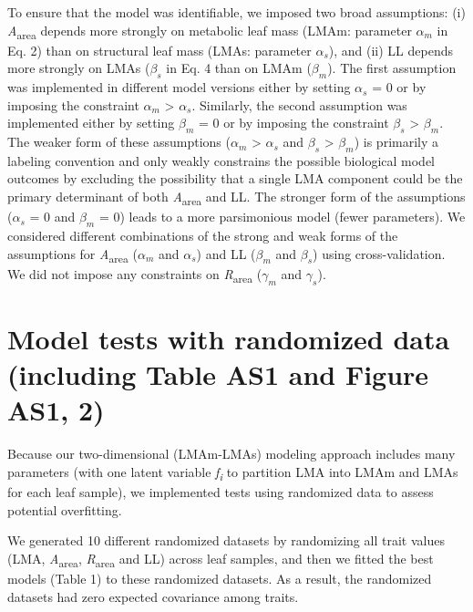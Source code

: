\documentclass[
  12pt,
  letterpaper,
  DIV=11,
  numbers=noendperiod]{scrartcl}
\numberwithin{equation}{section}
\begin{document}
To ensure that the model was identifiable, we imposed two broad
assumptions: (i) \emph{A}\textsubscript{area} depends more strongly on
metabolic leaf mass (LMAm: parameter \(\alpha_m\) in Eq. 2) than on
structural leaf mass (LMAs: parameter \(\alpha_s\)), and (ii) LL depends
more strongly on LMAs (\(\beta_s\) in Eq. 4 than on LMAm (\(\beta_m\)).
The first assumption was implemented in different model versions either
by setting \(\alpha_s\) = 0 or by imposing the constraint \(\alpha_m\)
\textgreater{} \(\alpha_s\). Similarly, the second assumption was
implemented either by setting \(\beta_m\) = 0 or by imposing the
constraint \(\beta_s\) \textgreater{} \(\beta_m\). The weaker form of
these assumptions (\(\alpha_m\) \textgreater{} \(\alpha_s\) and
\(\beta_s\) \textgreater{} \(\beta_m\)) is primarily a labeling
convention and only weakly constrains the possible biological model
outcomes by excluding the possibility that a single LMA component could
be the primary determinant of both \emph{A}\textsubscript{area} and LL.
The stronger form of the assumptions (\(\alpha_s\) = 0 and \(\beta_m\) =
0) leads to a more parsimonious model (fewer parameters). We considered
different combinations of the strong and weak forms of the assumptions
for \emph{A}\textsubscript{area} (\(\alpha_m\) and \(\alpha_s\)) and LL
(\(\beta_m\) and \(\beta_s\)) using cross-validation. We did not impose
any constraints on \emph{R}\textsubscript{area} (\(\gamma_m\) and
\(\gamma_s\)).

\newpage

\section{Model tests with randomized data (including Table AS1 and
Figure AS1,
2)}\label{model-tests-with-randomized-data-including-table-as1-and-figure-as1-2}

Because our two-dimensional (LMAm-LMAs) modeling approach includes many
parameters (with one latent variable \emph{f\textsubscript{i}} to
partition LMA into LMAm and LMAs for each leaf sample), we implemented
tests using randomized data to assess potential overfitting.

We generated 10 different randomized datasets by randomizing all trait
values (LMA, \emph{A}\textsubscript{area}, \emph{R}\textsubscript{area}
and LL) across leaf samples, and then we fitted the best models (Table
1) to these randomized datasets. As a result, the randomized datasets
had zero expected covariance among traits.
\end{document}
